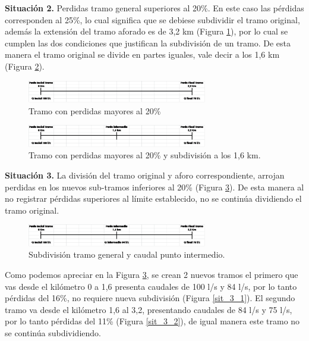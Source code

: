 \documentclass[]{article}
\begin{document}
\textbf{Situación 2.} Perdidas tramo general superiores al 20\%. En este caso las pérdidas corresponden al 25\%, lo cual significa que se debiese subdividir el tramo original, además la extensión del tramo aforado es de 3,2 km (Figura \ref{sit_2}), por lo cual se cumplen las dos condiciones que justifican la subdivisión de un tramo. De esta manera el tramo original se divide en partes iguales, vale decir a los 1,6 km (Figura \ref{sit_2_1}).

\begin{figure}[h]
\centering
\includegraphics[width=0.7\textwidth]{images/sit_2.eps}
\caption{Tramo con perdidas mayores al 20\%}
\label{sit_2}
\end{figure}

\begin{figure}[h]
\centering
\includegraphics[width=0.7\textwidth]{images/sit_2_1.eps}
\caption{Tramo con perdidas mayores al 20\% y subdivisión a los 1,6 km.}
\label{sit_2_1}
\end{figure}

\textbf{Situación 3.} La división del tramo original y aforo correspondiente, arrojan perdidas en los nuevos sub-tramos inferiores al 20\% (Figura \ref{sit_3}). De esta manera al no registrar pérdidas superiores al límite establecido, no se continúa dividiendo el tramo original.\\

\begin{figure}[h]
\centering
\includegraphics[width=0.7\textwidth]{images/sit_3.eps}
\caption{Subdivisión tramo general y caudal punto intermedio.}
\label{sit_3}
\end{figure}

Como podemos apreciar en la Figura \ref{sit_3}, se crean 2 nuevos tramos  el primero que vas desde el kilómetro 0 a 1,6 presenta caudales de 100 l/s y 84 l/s, por lo tanto pérdidas del 16\%, no requiere nueva subdivisión (Figura \ref{sit_3_1}). El segundo tramo va desde el kilómetro 1,6 al 3,2, presentando caudales de 84 l/s y 75 l/s, por lo tanto pérdidas del 11\% (Figura \ref{sit_3_2}), de igual manera este tramo no se continúa subdividiendo.\\
\end{document}
